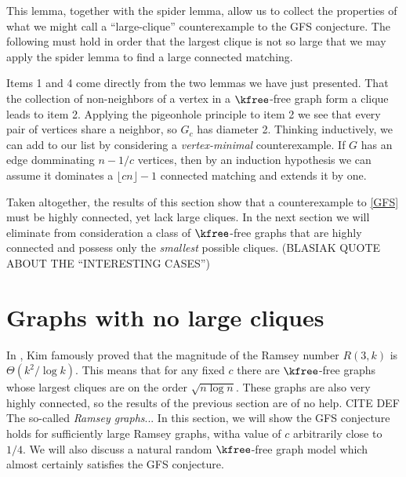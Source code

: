 This lemma, together with the spider lemma, allow us to collect the properties of what we might call a ``large-clique'' counterexample to the GFS conjecture.   The following must hold in order that the largest clique is not so large that we may apply the spider lemma to find a large connected matching.
  

Items 1 and 4 come directly from the two lemmas we have just presented.  That the collection of non-neighbors of a vertex in a $\kfree$-free graph form a clique leads to item 2.  Applying the pigeonhole principle to item 2 we see that every pair of vertices share a neighbor, so $G_c$ has diameter 2.  Thinking inductively, we can add to our list by considering a {\it vertex-minimal} counterexample.
If $G$ has an edge domminating $n-1/c$ vertices, then by an induction hypothesis we can assume it dominates a $\lfloor cn\rfloor-1$ connected matching and extends it by one.   

Taken altogether, the results of this section show that a counterexample to \ref{GFS} must be highly connected, yet lack large cliques.  In the next section we will eliminate from consideration a class of $\kfree$-free graphs that are highly connected and possess only the {\it smallest} possible cliques. (BLASIAK QUOTE ABOUT THE ``INTERESTING CASES'')

\section{Graphs with no large cliques}

In \cite{MR1369063}, Kim famously proved that the magnitude of the Ramsey number $R(3,k)$ is $\Theta(k^2/\log k)$.
%
This means that for any fixed $c$ there are $\kfree$-free graphs whose largest cliques are on the order $\sqrt{n\log n}$. 
%
These graphs are also very highly connected, so the results of the previous section are of no help.
%
CITE DEF The so-called \textit{Ramsey graphs}...
%
In this section, we will show the GFS conjecture holds for sufficiently large Ramsey graphs, witha value of $c$ arbitrarily close to $1/4$.
%
We will also discuss a natural random $\kfree$-free graph model which almost certainly satisfies the GFS conjecture. 

